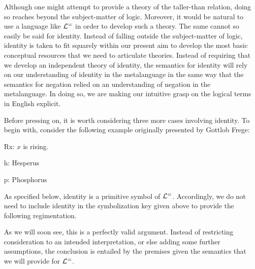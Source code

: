 Although one might attempt to provide a theory of the taller-than relation, doing so reaches beyond the subject-matter of logic.
Moreover, it would be natural to use a language like $\mathcal{L}^{=}$ in order to develop such a theory. 
The same cannot so easily be said for identity.
Instead of falling outside the subject-matter of logic, identity is taken to fit squarely within our present aim to develop the most basic conceptual resources that we need to articulate theories.
Instead of requiring that we develop an independent theory of identity, the semantics for identity will rely on our understanding of identity in the metalanguage in the same way that the semantics for negation relied on an understanding of negation in the metalanguage.
In doing so, we are making our intuitive grasp on the logical terms in English explicit.

Before pressing on, it is worth considering three more cases involving identity.
To begin with, consider the following example originally presented by Gottlob Frege:
\begin{multicols}{2}
  \begin{ekey}
      \item[Rx:] $x$ is rising.
      \item[h:] Hesperus
      \item[p:] Phosphorus
  \end{ekey}

  \columnbreak

  \begin{earg} \label{informHP}
  \end{earg}
\end{multicols}
As specified below, identity is a primitive symbol of $\mathcal{L}^{=}$.
Accordingly, we do not need to include identity in the symbolization key given above to provide the following regimentation.
\begin{earg} \label{formHP}
\end{earg}
As we will soon see, this is a perfectly valid argument.
Instead of restricting consideration to an intended interpretation, or else adding some further assumptions, the conclusion is entailed by the premises given the semantics that we will provide for $\mathcal{L}^{=}$.


